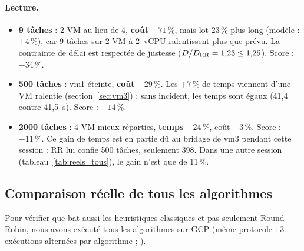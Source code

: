 \paragraph{Lecture.}
\begin{itemize}
  \item \textbf{9 tâches} : 2 VM au lieu de 4, \textbf{coût $-71\,\%$}, mais
        lot 23\,\% plus long (modèle : $+4\,\%$), car 9 tâches sur 2 VM à
        2~vCPU ralentissent plus que prévu. La contrainte de délai est respectée
        de justesse ($D/D_{\mathrm{RR}} = 1{,}23 \le 1{,}25$). Score : $-34\,\%$.
  \item \textbf{500 tâches} : vm1 éteinte, \textbf{coût $-29\,\%$}. Les $+7\,\%$
        de temps viennent d'une VM ralentie (section~\ref{sec:vm3}) : sans
        incident, les temps sont égaux (41,4 contre 41,5~s). Score : $-14\,\%$.
  \item \textbf{2000 tâches} : 4 VM mieux réparties, \textbf{temps $-24\,\%$},
        coût $-3\,\%$. Score : $-11\,\%$. Ce gain de temps est en partie dû au
        bridage de vm3 pendant cette session : RR lui confie 500 tâches, \sel{}
        seulement 398. Dans une autre session (tableau~\ref{tab:reels_tous}),
        le gain n'est que de 11\,\%.
\end{itemize}

\subsection{Comparaison réelle de tous les algorithmes}

Pour vérifier que \sel{} bat aussi les heuristiques classiques et pas seulement
Round Robin, nous avons exécuté tous les algorithmes sur GCP (même protocole :
3 exécutions alternées par algorithme ; ).

